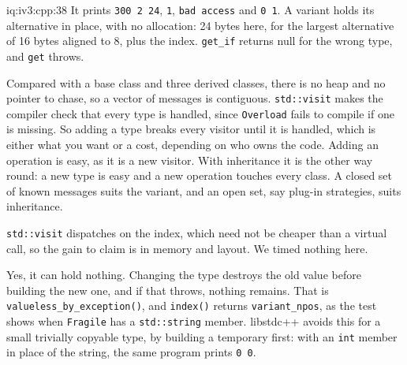 \begin{solution}{iq:iv3:cpp:38}
It prints \texttt{300 2 24}, \texttt{1}, \texttt{bad access} and \texttt{0 1}. A variant holds its alternative in place, with no allocation: 24 bytes here, for the largest alternative of 16 bytes aligned to 8, plus the index. \texttt{get\_if} returns null for the wrong type, and \texttt{get} throws.

Compared with a base class and three derived classes, there is no heap and no pointer to chase, so a vector of messages is contiguous. \texttt{std::visit} makes the compiler check that every type is handled, since \texttt{Overload} fails to compile if one is missing. So adding a type breaks every visitor until it is handled, which is either what you want or a cost, depending on who owns the code. Adding an operation is easy, as it is a new visitor. With inheritance it is the other way round: a new type is easy and a new operation touches every class. A closed set of known messages suits the variant, and an open set, say plug-in strategies, suits inheritance.

\texttt{std::visit} dispatches on the index, which need not be cheaper than a virtual call, so the gain to claim is in memory and layout. We timed nothing here.

Yes, it can hold nothing. Changing the type destroys the old value before building the new one, and if that throws, nothing remains. That is \texttt{valueless\_by\_exception()}, and \texttt{index()} returns \texttt{variant\_npos}, as the test shows when \texttt{Fragile} has a \texttt{std::string} member. libstdc++ avoids this for a small trivially copyable type, by building a temporary first: with an \texttt{int} member in place of the string, the same program prints \texttt{0 0}.

\end{solution}

